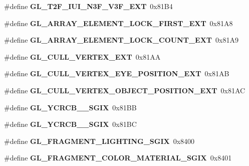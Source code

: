\begin{DoxyCompactItemize}
\item 
\#define {\bfseries G\+L\+\_\+\+T2\+F\+\_\+\+I\+U\+I\+\_\+\+N3\+F\+\_\+\+V3\+F\+\_\+\+E\+X\+T}~0x81\+B4\label{_s_d_l__opengl_8h_a3b24af74462b4d1a8dc2f14f5fc36df5}

\item 
\#define {\bfseries G\+L\+\_\+\+A\+R\+R\+A\+Y\+\_\+\+E\+L\+E\+M\+E\+N\+T\+\_\+\+L\+O\+C\+K\+\_\+\+F\+I\+R\+S\+T\+\_\+\+E\+X\+T}~0x81\+A8\label{_s_d_l__opengl_8h_a48ceffdaa56a2f7055a7abb661325528}

\item 
\#define {\bfseries G\+L\+\_\+\+A\+R\+R\+A\+Y\+\_\+\+E\+L\+E\+M\+E\+N\+T\+\_\+\+L\+O\+C\+K\+\_\+\+C\+O\+U\+N\+T\+\_\+\+E\+X\+T}~0x81\+A9\label{_s_d_l__opengl_8h_a255a5ce7f18b7f1b28746355714bfe84}

\item 
\#define {\bfseries G\+L\+\_\+\+C\+U\+L\+L\+\_\+\+V\+E\+R\+T\+E\+X\+\_\+\+E\+X\+T}~0x81\+A\+A\label{_s_d_l__opengl_8h_a8fa1f1abe100d42d2308aecfda8933f1}

\item 
\#define {\bfseries G\+L\+\_\+\+C\+U\+L\+L\+\_\+\+V\+E\+R\+T\+E\+X\+\_\+\+E\+Y\+E\+\_\+\+P\+O\+S\+I\+T\+I\+O\+N\+\_\+\+E\+X\+T}~0x81\+A\+B\label{_s_d_l__opengl_8h_add3da2e87a704008bb147fd6535f57f3}

\item 
\#define {\bfseries G\+L\+\_\+\+C\+U\+L\+L\+\_\+\+V\+E\+R\+T\+E\+X\+\_\+\+O\+B\+J\+E\+C\+T\+\_\+\+P\+O\+S\+I\+T\+I\+O\+N\+\_\+\+E\+X\+T}~0x81\+A\+C\label{_s_d_l__opengl_8h_af88e54b01a0fce068fff831cb60fa91d}

\item 
\#define {\bfseries G\+L\+\_\+\+Y\+C\+R\+C\+B\+\_\+\_\+\+S\+G\+I\+X}~0x81\+B\+B\label{_s_d_l__opengl_8h_a936fdc2fc74365f057ad02dc0f10f2c2}

\item 
\#define {\bfseries G\+L\+\_\+\+Y\+C\+R\+C\+B\+\_\+\_\+\+S\+G\+I\+X}~0x81\+B\+C\label{_s_d_l__opengl_8h_ae80a056419c6047cab98acb0835518fe}

\item 
\#define {\bfseries G\+L\+\_\+\+F\+R\+A\+G\+M\+E\+N\+T\+\_\+\+L\+I\+G\+H\+T\+I\+N\+G\+\_\+\+S\+G\+I\+X}~0x8400\label{_s_d_l__opengl_8h_ab713f1be2f111c602113ea970ae66fa7}

\item 
\#define {\bfseries G\+L\+\_\+\+F\+R\+A\+G\+M\+E\+N\+T\+\_\+\+C\+O\+L\+O\+R\+\_\+\+M\+A\+T\+E\+R\+I\+A\+L\+\_\+\+S\+G\+I\+X}~0x8401\label{_s_d_l__opengl_8h_a483b074b4a50a9e9b2a8e5390efea9fd}


\end{DoxyCompactItemize}
